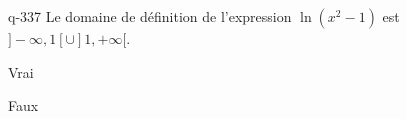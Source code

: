 \begin{truefalse}{q-337}
Le domaine de définition de l'expression $\ln(x^2-1)$ est $]-\infty,1[\cup ]1,+\infty[$.
\item Vrai
\item* Faux
\end{truefalse}

